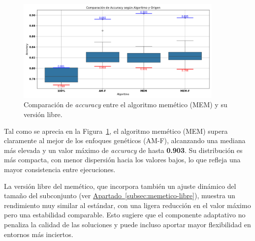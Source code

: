 \begin{figure}[htp]
    \centering
    \includegraphics[width=0.9\textwidth]{imagenes/evaluaciones/comparacion-memetico}
    \caption{Comparación de \textit{accuracy} entre el algoritmo memético (MEM) y su versión libre.}
    \label{fig:memetico_comparacion}
\end{figure}

Tal como se aprecia en la Figura~\ref{fig:memetico_comparacion}, el algoritmo memético (MEM) supera claramente al mejor de los enfoques genéticos
(AM-F), alcanzando una mediana más elevada y un valor máximo de \textit{accuracy} de hasta \textbf{0.903}.
Su distribución es más compacta, con menor dispersión hacia los valores bajos, lo que refleja una mayor consistencia entre ejecuciones.

La versión libre del memético, que incorpora también un ajuste dinámico del tamaño del subconjunto
(ver \hyperref[subsec:memetico-libre]{Apartado~\ref*{subsec:memetico-libre}}), muestra un rendimiento muy similar al estándar,
con una ligera reducción en el valor máximo pero una estabilidad comparable.
Esto sugiere que el componente adaptativo no penaliza la calidad de las soluciones y puede incluso aportar mayor flexibilidad en entornos más inciertos.


